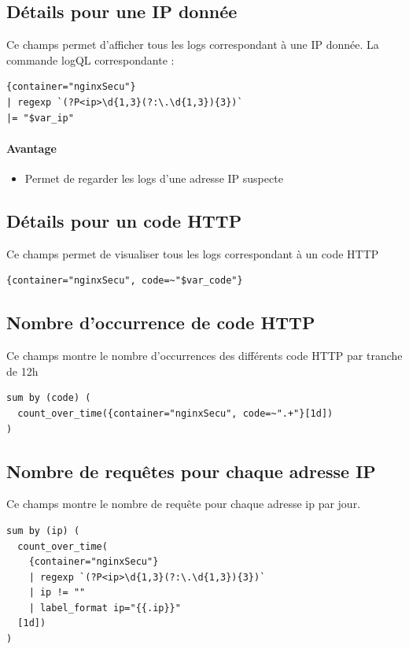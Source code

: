 \documentclass[french, 12pt]{article}%
\newcommand{\itemE}{\item[$\bullet$]}
\begin{document}
\subsection{Détails pour une IP donnée}
Ce champs permet d'afficher tous les logs correspondant à une IP donnée. La commande logQL correspondante : 

\begin{lstlisting}[style=commande]
{container="nginxSecu"}
| regexp `(?P<ip>\d{1,3}(?:\.\d{1,3}){3})`
|= "$var_ip"
\end{lstlisting}

\paragraph{Avantage }
\begin{itemize}
\itemE Permet de regarder les logs d'une adresse IP suspecte
\end{itemize}

\subsection{Détails pour un code HTTP}

Ce champs permet de visualiser tous les logs correspondant à un code HTTP

\begin{lstlisting}[style=commande]
{container="nginxSecu", code=~"$var_code"}
\end{lstlisting}

\subsection{Nombre d'occurrence de code HTTP}

Ce champs montre le nombre d'occurrences des différents code HTTP par tranche de 12h

\begin{lstlisting}[style=commande]
sum by (code) (
  count_over_time({container="nginxSecu", code=~".+"}[1d])
)
\end{lstlisting}


\subsection{Nombre de requêtes pour chaque adresse IP}

Ce champs montre le nombre de requête pour chaque adresse ip par jour.

\begin{lstlisting}[style=commande]
sum by (ip) (
  count_over_time(
    {container="nginxSecu"}
    | regexp `(?P<ip>\d{1,3}(?:\.\d{1,3}){3})`
    | ip != ""
    | label_format ip="{{.ip}}"
  [1d])
)
\end{lstlisting}
\end{document}
